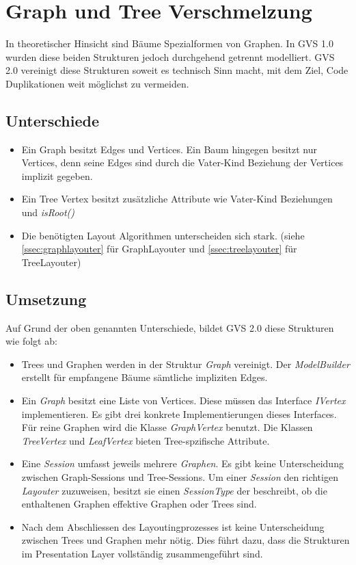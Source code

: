 \documentclass[11pt,a4paper,english,oneside]{book}
\numberwithin{equation}{chapter}
\begin{document}
	\section{Graph und Tree Verschmelzung} \label{graph-vs-tree}
	In theoretischer Hinsicht sind Bäume Spezialformen von Graphen. In GVS 1.0 wurden diese beiden Strukturen jedoch durchgehend getrennt modelliert. GVS 2.0 vereinigt diese Strukturen soweit es technisch Sinn macht, mit dem Ziel, Code Duplikationen weit möglichst zu vermeiden.
	
	\subsection{Unterschiede}
	\begin{itemize}
		\item Ein Graph besitzt Edges und Vertices. Ein Baum hingegen besitzt nur Vertices, denn seine Edges sind durch die Vater-Kind Beziehung der Vertices implizit gegeben. 
		\item Ein Tree Vertex besitzt zusätzliche Attribute wie Vater-Kind Beziehungen und \textit{isRoot()}
		\item Die benötigten Layout Algorithmen unterscheiden sich stark. (siehe \ref{ssec:graphlayouter} für GraphLayouter und \ref{ssec:treelayouter} für TreeLayouter)
	\end{itemize}
	
	\subsection{Umsetzung}
	Auf Grund der oben genannten Unterschiede, bildet GVS 2.0 diese Strukturen wie folgt ab:
	
	\begin{itemize}
		\item Trees und Graphen werden in der Struktur \textit{Graph} vereinigt. Der \textit{ModelBuilder} erstellt für empfangene Bäume sämtliche impliziten Edges.
		\item Ein \textit{Graph} besitzt eine Liste von Vertices. Diese müssen das Interface \textit{IVertex} implementieren. Es gibt drei konkrete Implementierungen dieses Interfaces. Für reine Graphen wird die Klasse \textit{GraphVertex} benutzt. Die Klassen \textit{TreeVertex} und \textit{LeafVertex} bieten Tree-spzifische Attribute.
		\item Eine \textit{Session} umfasst jeweils mehrere \textit{Graphen}. Es gibt keine Unterscheidung zwischen Graph-Sessions und Tree-Sessions. Um einer \textit{Session} den richtigen \textit{Layouter} zuzuweisen, besitzt sie einen \textit{SessionType} der beschreibt, ob die enthaltenen Graphen effektive Graphen oder Trees sind.
		\item Nach dem Abschliessen des Layoutingprozesses ist keine Unterscheidung zwischen Trees und Graphen mehr nötig. Dies führt dazu, dass die Strukturen im Presentation Layer vollständig zusammengeführt sind.
	\end{itemize}
	
\end{document}
